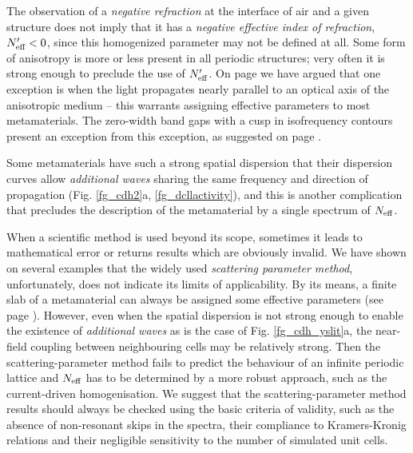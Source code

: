 The observation of a \textit{negative refraction} at the interface of air and a given structure does not imply that it has a \textit{negative effective index of refraction}, $N_{\text{eff} }'<0$, since this homogenized parameter may not be defined at all. Some form of anisotropy is more or less present in all periodic structures; very often it is strong enough to preclude the use of $N_{\text{eff} }'$. On page \pageref{indexofrefraction} we have argued that one exception is when the light propagates nearly parallel to an optical axis of the anisotropic medium -- this warrants assigning effective parameters to most metamaterials. The zero-width band gaps with a cusp in isofrequency contours present an exception from this exception, as suggested on page \pageref{diracpoint}. 

Some metamaterials have such a strong spatial dispersion that their dispersion curves allow \textit{additional waves} sharing the same frequency and direction of propagation (Fig. \ref{fg_cdh2}a, \ref{fg_dcllactivity}), and this is another complication that precludes the description of the metamaterial by a single spectrum of $N_{\text{eff} }$. 

When a scientific method is used beyond its scope, sometimes it leads to mathematical error or returns results which are obviously invalid. We have shown on several examples that the widely used \textit{scattering parameter method}, unfortunately, does not indicate its limits of applicability. By its means, a finite slab of a metamaterial can always be assigned some effective parameters (see page \pageref{sparamweaknesses}). However, even when the spatial dispersion is not strong enough to enable the existence of \textit{additional waves} as is the case of Fig. \ref{fg_cdh_yslit}a, the near-field coupling between neighbouring cells may be relatively strong. Then the scattering-parameter method fails to predict the behaviour of an infinite periodic lattice and $N_{\text{eff} }$ has to be determined by a more robust approach, such as the current-driven homogenisation. We suggest that the scattering-parameter method results should always be checked using the basic criteria of validity, such as the absence of non-resonant skips in the spectra, their compliance to Kramers-Kronig relations and their negligible sensitivity to the number of simulated unit cells.

